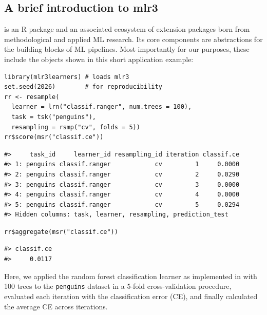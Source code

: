 \subsection{A brief introduction to mlr3}\label{a-brief-introduction-to-mlr3}

 is an R package and an associated ecosystem of extension packages born from methodological and applied ML research.
Its core components are abstractions for the building blocks of ML pipelines.
Most importantly for our purposes, these include the objects shown in this short application example:

\begin{verbatim}
library(mlr3learners) # loads mlr3
set.seed(2026)        # for reproducibility
rr <- resample(
  learner = lrn("classif.ranger", num.trees = 100),
  task = tsk("penguins"),
  resampling = rsmp("cv", folds = 5))
rr$score(msr("classif.ce"))
\end{verbatim}

\begin{verbatim}
#>     task_id     learner_id resampling_id iteration classif.ce
#> 1: penguins classif.ranger            cv         1     0.0000
#> 2: penguins classif.ranger            cv         2     0.0290
#> 3: penguins classif.ranger            cv         3     0.0000
#> 4: penguins classif.ranger            cv         4     0.0000
#> 5: penguins classif.ranger            cv         5     0.0294
#> Hidden columns: task, learner, resampling, prediction_test
\end{verbatim}

\begin{verbatim}
rr$aggregate(msr("classif.ce"))
\end{verbatim}

\begin{verbatim}
#> classif.ce 
#>     0.0117
\end{verbatim}

Here, we applied the random forest classification learner as implemented in  with 100 trees to the \texttt{penguins} dataset \citep{horst2020palmerpenguinspalmer} in a 5-fold cross-validation procedure, evaluated each iteration with the classification error (CE), and finally calculated the average CE across iterations.

